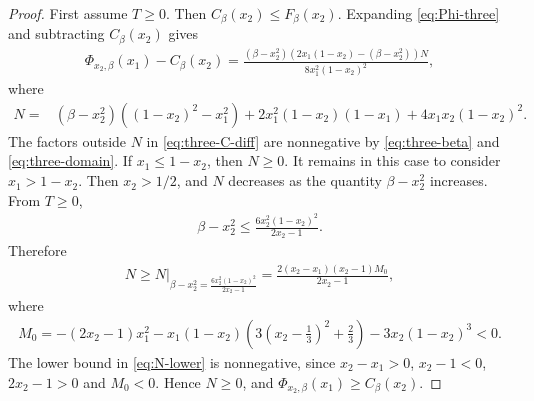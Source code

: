 \documentclass[10pt,a4paper]{article}
\begin{document}
\begin{proof}
First assume $T\ge0$.  Then $C_\beta(x_2)\le F_\beta(x_2)$.  Expanding \eqref{eq:Phi-three} and subtracting $C_\beta(x_2)$ gives
\begin{align}\label{eq:three-C-diff}
  \Phi_{x_2,\beta}(x_1)-C_\beta(x_2)
  =\frac{(\beta-x_2^2)(2x_1(1-x_2)-(\beta-x_2^2))N}{8x_1^2(1-x_2)^2},
\end{align}
where
\begin{align*}
N={}&(\beta-x_2^2)((1-x_2)^2-x_1^2)
+2x_1^2(1-x_2)(1-x_1)+4x_1x_2(1-x_2)^2.
\end{align*}
The factors outside $N$ in \eqref{eq:three-C-diff} are nonnegative by \eqref{eq:three-beta} and \eqref{eq:three-domain}.  If $x_1\le1-x_2$, then $N\ge0$.  It remains in this case to consider $x_1>1-x_2$.  Then $x_2>1/2$, and $N$ decreases as the quantity $\beta-x_2^2$ increases.  From $T\ge0$,
\begin{align*}
  \beta-x_2^2\le \frac{6x_2^2(1-x_2)^2}{2x_2-1}.
\end{align*}
Therefore
\begin{align}\label{eq:N-lower}
  N\ge
  \left.N\right|_{\beta-x_2^2=\frac{6x_2^2(1-x_2)^2}{2x_2-1}}
  =\frac{2(x_2-x_1)(x_2-1)M_0}{2x_2-1},
\end{align}
where
\begin{align*}
  M_0=-(2x_2-1)x_1^2-x_1(1-x_2)\left(3\left(x_2-\frac{1}{3}\right)^2+\frac23\right)-3x_2(1-x_2)^3<0.
\end{align*}
The lower bound in \eqref{eq:N-lower} is nonnegative, since $x_2-x_1>0$, $x_2-1<0$, $2x_2-1>0$ and $M_0<0$.  Hence $N\ge0$, and $\Phi_{x_2,\beta}(x_1)\ge C_\beta(x_2)$.


\end{proof}
\end{document}
